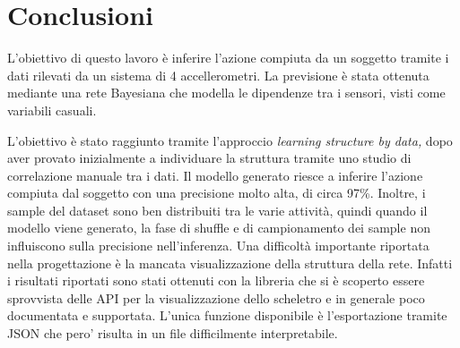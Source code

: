\documentclass[12pt]{article}
\begin{document}
\section{Conclusioni}
L'obiettivo di questo lavoro è inferire l'azione compiuta da un soggetto tramite i dati rilevati da un sistema di 4 accellerometri. La previsione è stata ottenuta mediante una rete Bayesiana che modella le dipendenze tra i sensori, visti come variabili casuali.\par L'obiettivo è stato raggiunto tramite l'approccio \textit{learning structure by data,} dopo aver provato inizialmente a individuare la struttura tramite uno studio di correlazione manuale tra i dati. Il modello generato riesce a inferire l'azione compiuta dal soggetto con una precisione molto alta, di circa 97\%. Inoltre, i sample del dataset sono ben distribuiti tra le varie attività, quindi quando il modello viene generato, la fase di shuffle e di campionamento dei sample non influiscono sulla precisione nell'inferenza. Una difficoltà importante riportata nella progettazione è la mancata visualizzazione della struttura della rete. Infatti i risultati riportati sono stati ottenuti con la libreria \cite{pomegranate} che si è scoperto essere sprovvista delle API per la visualizzazione dello scheletro e in generale poco documentata e supportata. L'unica funzione disponibile è l'esportazione tramite JSON che pero' risulta in un file difficilmente interpretabile.
\newpage


\end{document}
